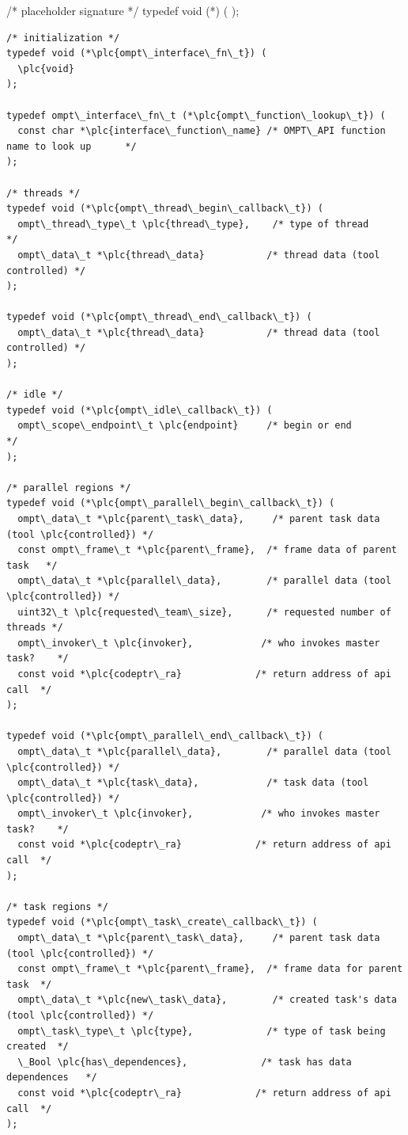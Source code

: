 \documentclass{article}
\begin{document}
\begin{boxedcode}
/* placeholder signature  */
typedef void (*) (    
);

\begin{verbatim}
/* initialization */
typedef void (*\plc{ompt\_interface\_fn\_t}) (
  \plc{void}
);

typedef ompt\_interface\_fn\_t (*\plc{ompt\_function\_lookup\_t}) (
  const char *\plc{interface\_function\_name} /* OMPT\_API function name to look up      */
);

/* threads */
typedef void (*\plc{ompt\_thread\_begin\_callback\_t}) (
  ompt\_thread\_type\_t \plc{thread\_type},    /* type of thread              */
  ompt\_data\_t *\plc{thread\_data}           /* thread data (tool controlled) */
);

typedef void (*\plc{ompt\_thread\_end\_callback\_t}) (
  ompt\_data\_t *\plc{thread\_data}           /* thread data (tool controlled) */
);

/* idle */
typedef void (*\plc{ompt\_idle\_callback\_t}) ( 
  ompt\_scope\_endpoint\_t \plc{endpoint}     /* begin or end                */
);

/* parallel regions */
typedef void (*\plc{ompt\_parallel\_begin\_callback\_t}) (
  ompt\_data\_t *\plc{parent\_task\_data},     /* parent task data (tool \plc{controlled}) */
  const ompt\_frame\_t *\plc{parent\_frame},  /* frame data of parent task   */
  ompt\_data\_t *\plc{parallel\_data},        /* parallel data (tool \plc{controlled}) */
  uint32\_t \plc{requested\_team\_size},      /* requested number of threads */
  ompt\_invoker\_t \plc{invoker},            /* who invokes master task?    */
  const void *\plc{codeptr\_ra}             /* return address of api call  */ 
);

typedef void (*\plc{ompt\_parallel\_end\_callback\_t}) (
  ompt\_data\_t *\plc{parallel\_data},        /* parallel data (tool \plc{controlled}) */
  ompt\_data\_t *\plc{task\_data},            /* task data (tool \plc{controlled}) */
  ompt\_invoker\_t \plc{invoker},            /* who invokes master task?    */
  const void *\plc{codeptr\_ra}             /* return address of api call  */ 
);

/* task regions */
typedef void (*\plc{ompt\_task\_create\_callback\_t}) ( 
  ompt\_data\_t *\plc{parent\_task\_data},     /* parent task data (tool \plc{controlled}) */
  const ompt\_frame\_t *\plc{parent\_frame},  /* frame data for parent task  */
  ompt\_data\_t *\plc{new\_task\_data},        /* created task's data (tool \plc{controlled}) */
  ompt\_task\_type\_t \plc{type},             /* type of task being created  */ 
  \_Bool \plc{has\_dependences},             /* task has data dependences   */
  const void *\plc{codeptr\_ra}             /* return address of api call  */ 
);


\end{verbatim}
\end{boxedcode}
\end{document}
